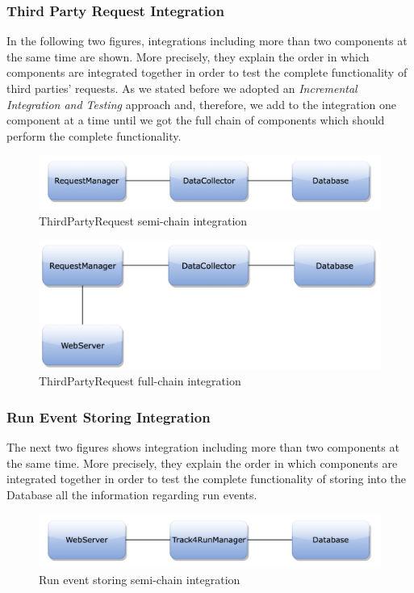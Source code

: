 \newpage
\subsubsection{Third Party Request Integration}
In the following two figures, integrations including more than two components at the same time are shown. More precisely, they explain the order in which components are integrated together in order to test the complete functionality of third parties' requests. As we stated before we adopted  an \textit{Incremental Integration and Testing} approach and, therefore, we add to the integration one component at a time until we got the full chain of components which should perform the complete functionality.
\begin{figure}[H]
\centering
\includegraphics[scale=0.65]{Images/IntegrationPlanImages/fig15.png}
\caption{ThirdPartyRequest semi-chain integration}
\end{figure}

\begin{figure}[H]
\centering
\includegraphics[scale=0.35]{Images/IntegrationPlanImages/fig16.png}
\caption{ThirdPartyRequest full-chain integration}
\end{figure}

\subsubsection{Run Event Storing Integration}
The next two figures shows integration including more than two components at the same time. More precisely, they explain the order in which components are integrated together in order to test the complete functionality of storing into the Database all the information regarding run events. 
\begin{figure}[H]
\centering
\includegraphics[scale=0.65]{Images/IntegrationPlanImages/fig17.png}
\caption{Run event storing semi-chain integration}
\end{figure}

